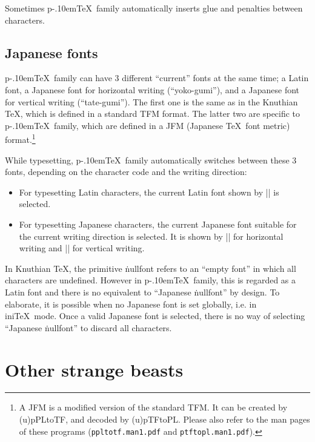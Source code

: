 \documentclass[a4paper,11pt]{article}
\let\emph=\origemph
\def\code#1{\texttt{#1}}
\def\pTeX{p\kern-.10em\TeX}
\begin{document}
Sometimes \pTeX\ family automatically inserts glue and penalties
between characters.

\subsection{Japanese fonts}

\pTeX\ family can have 3 different ``current'' fonts at the same time;
a Latin font, a Japanese font for horizontal writing (``yoko-gumi''),
and a Japanese font for vertical writing (``tate-gumi'').
The first one is the same as in the Knuthian \TeX,
which is defined in a standard TFM format.
The latter two are specific to \pTeX\ family, which are defined
in a JFM (Japanese \TeX\ font metric) format.\footnote{%
A JFM is a modified version of the standard TFM.
It can be created by (u)pPLtoTF, and decoded by (u)pTFtoPL.
Please also refer to the man pages of these programs
(\code{ppltotf.man1.pdf} and \code{ptftopl.man1.pdf}).}

While typesetting, \pTeX\ family automatically switches between
these 3 fonts, depending on the character code and the writing direction:
\begin{itemize}
  \item For typesetting Latin characters,
    the current Latin font shown by |\the\font| is selected.
  \item For typesetting Japanese characters,
    the current Japanese font suitable for the current writing direction
    is selected. It is shown by |\the\jfont| for horizontal writing
    and |\the\tfont| for vertical writing.
\end{itemize}

In Knuthian \TeX, the primitive \.{nullfont} refers to an ``empty font''
in which all characters are undefined.
However in \pTeX\ family, this is regarded as a Latin font
and there is no equivalent to ``Japanese \.{nullfont}'' by design.
To elaborate, it is possible \emph{only} when no Japanese font is
set globally, i.e. in ini\TeX\ mode.
Once a valid Japanese font is selected, there is no way of
selecting ``Japanese \.{nullfont}'' to discard all characters.

\section{Other strange beasts}
\end{document}
